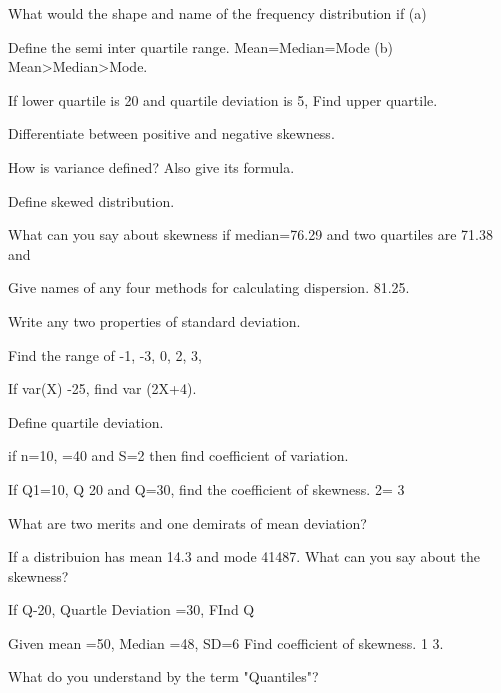 \documentclass[11pt,a4paper]{article}
\begin{document}
\begin{shortlist}
\item What would the shape and name of the frequency distribution if (a)

\item Define the semi inter quartile range. Mean=Median=Mode (b) Mean>Median>Mode.

\item If lower quartile is 20 and quartile deviation is 5, Find upper quartile.

\item Differentiate between positive and negative skewness.

\item How is variance defined? Also give its formula.

\item Define skewed distribution.

\item What can you say about skewness if median=76.29 and two quartiles are 71.38 and

\item Give names of any four methods for calculating dispersion. 81.25.

\item Write any two properties of standard deviation.

\item Find the range of -1, -3, 0, 2, 3,

\item If var(X) -25, find var (2X+4).

\item Define quartile deviation.

\item if n=10, =40 and S=2 then find coefficient of variation.

\item If Q1=10, Q 20 and Q=30, find the coefficient of skewness. 2= 3

\item What are two merits and one demirats of mean deviation?

\item If a distribuion has mean 14.3 and mode 41487. What can you say about the skewness?

\item If Q-20, Quartle Deviation =30, FInd Q

\item Given mean =50, Median =48, SD=6 Find coefficient of skewness. 1 3.

\item What do you understand by the term "Quantiles"?


\end{shortlist}
\end{document}
